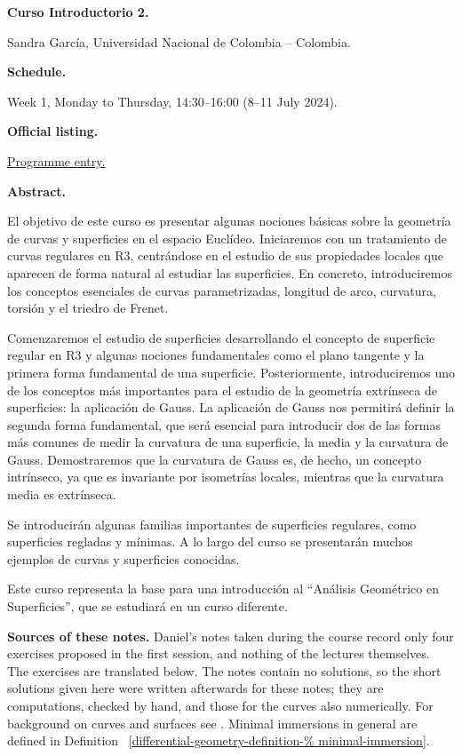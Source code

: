 \medskip\noindent
{\bf Curso Introductorio 2.}

Sandra García,
Universidad Nacional de Colombia --
Colombia.

\medskip\noindent
{\bf Schedule.}

Week 1, Monday to Thursday, 14:30--16:00
(8--11 July 2024).

\medskip\noindent
{\bf Official listing.}

\href{%
https://naturales.ues.edu.sv/%
ecimpasv2024/introductory-curse-2/}{%
Programme entry.}

\medskip\noindent
{\bf Abstract.}

El objetivo de este curso es presentar
algunas nociones básicas sobre la geometría
de curvas y superficies en el espacio
Euclídeo. Iniciaremos con un tratamiento de
curvas regulares en R3, centrándose en el
estudio de sus propiedades locales que
aparecen de forma natural al estudiar las
superficies. En concreto, introduciremos los
conceptos esenciales de curvas
parametrizadas, longitud de arco, curvatura,
torsión y el triedro de Frenet.

Comenzaremos el estudio de superficies
desarrollando el concepto de superficie
regular en R3 y algunas nociones
fundamentales como el plano tangente y la
primera forma fundamental de una superficie.
Posteriormente, introduciremos uno de los
conceptos más importantes para el estudio de
la geometría extrínseca de superficies: la
aplicación de Gauss. La aplicación de Gauss
nos permitirá definir la segunda forma
fundamental, que será esencial para
introducir dos de las formas más comunes de
medir la curvatura de una superficie, la
media y la curvatura de Gauss. Demostraremos
que la curvatura de Gauss es, de hecho, un
concepto intrínseco, ya que es invariante por
isometrías locales, mientras que la curvatura
media es extrínseca.

Se introducirán algunas familias importantes
de superficies regulares, como superficies
regladas y mínimas. A lo largo del curso se
presentarán muchos ejemplos de curvas y
superficies conocidas.

Este curso representa la base para una
introducción al ``Análisis Geométrico en
Superficies'', que se estudiará en un curso
diferente.

\medskip\noindent
{\bf Sources of these notes.}
Daniel's notes taken during the course
record only four exercises proposed in the
first session, and nothing of the lectures
themselves. The exercises are translated
below. The notes contain no solutions, so
the short solutions given here were written
afterwards for these notes; they are
computations, checked by hand, and those
for the curves also numerically. For
background on curves and surfaces see
\cite{docsu}. Minimal
immersions in general are defined in
Definition~%
\ref{differential-geometry-definition-%
minimal-immersion}.

